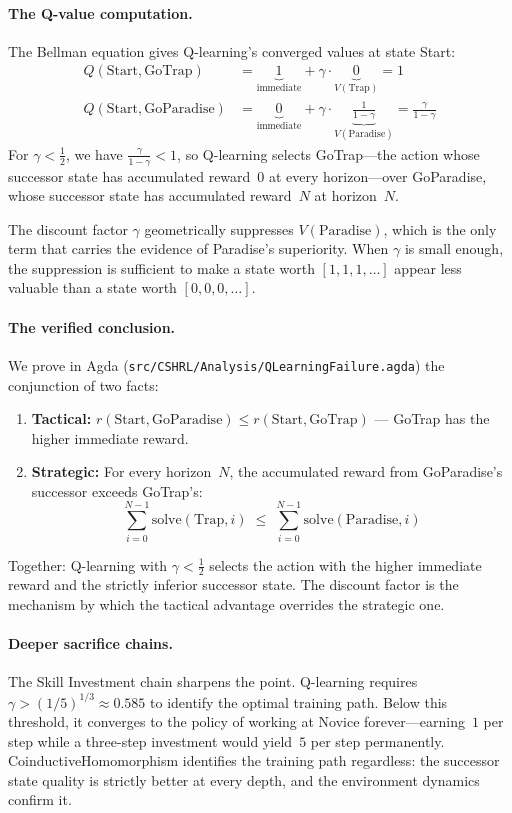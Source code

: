 \documentclass[9pt,a4paper]{article}
\newcommand{\fpath}[1]{\nolinkurl{#1}}
\theoremstyle{plain}
\theoremstyle{definition}
\theoremstyle{remark}
\begin{document}
\paragraph{The Q-value computation.}
The Bellman equation gives Q-learning's converged values at state Start:
\[
\begin{aligned}
Q(\text{Start}, \text{GoTrap})     &= \underbrace{1}_{\text{immediate}} + \gamma \cdot \underbrace{0}_{\textstyle V(\text{Trap})} = 1 \\[6pt]
Q(\text{Start}, \text{GoParadise}) &= \underbrace{0}_{\text{immediate}} + \gamma \cdot \underbrace{\tfrac{1}{1-\gamma}}_{\textstyle V(\text{Paradise})} = \tfrac{\gamma}{1-\gamma}
\end{aligned}
\]
For $\gamma < \tfrac{1}{2}$, we have $\tfrac{\gamma}{1-\gamma} < 1$, so Q-learning selects GoTrap---the action whose successor state has accumulated reward~$0$ at every horizon---over GoParadise, whose successor state has accumulated reward~$N$ at horizon~$N$.

The discount factor $\gamma$ geometrically suppresses $V(\text{Paradise})$, which is the only term that carries the evidence of Paradise's superiority.  When $\gamma$ is small enough, the suppression is sufficient to make a state worth $[1,1,1,\ldots]$ appear less valuable than a state worth $[0,0,0,\ldots]$.

\paragraph{The verified conclusion.}
We prove in Agda (\fpath{src/CSHRL/Analysis/QLearningFailure.agda}) the conjunction of two facts:
\begin{enumerate}
\item \textbf{Tactical:} $r(\text{Start}, \text{GoParadise}) \le r(\text{Start}, \text{GoTrap})$ --- GoTrap has the higher immediate reward.
\item \textbf{Strategic:} For every horizon~$N$, the accumulated reward from GoParadise's successor exceeds GoTrap's:
\[
\sum_{i=0}^{N-1} \text{solve}(\text{Trap}, i) \;\le\; \sum_{i=0}^{N-1} \text{solve}(\text{Paradise}, i)
\]
\end{enumerate}
Together: Q-learning with $\gamma < \tfrac{1}{2}$ selects the action with the higher immediate reward and the strictly inferior successor state.  The discount factor is the mechanism by which the tactical advantage overrides the strategic one.

\paragraph{Deeper sacrifice chains.}
The Skill Investment chain sharpens the point.  Q-learning requires $\gamma > (1/5)^{1/3} \approx 0.585$ to identify the optimal training path.  Below this threshold, it converges to the policy of working at Novice forever---earning~$1$ per step while a three-step investment would yield~$5$ per step permanently.  CoinductiveHomomorphism identifies the training path regardless: the successor state quality is strictly better at every depth, and the environment dynamics confirm it.
\end{document}
